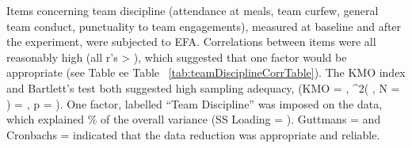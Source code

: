 Items concerning team discipline (attendance at meals, team curfew, general team conduct, punctuality to team engagements), measured at baseline and after the experiment, were subjected to EFA.  Correlations between items were all reasonably high (all r's > ), which suggested that one factor would be appropriate (see Table ee Table ~\ref{tab:teamDisciplineCorrTable}).
The KMO index and Bartlett's test both suggested high sampling adequacy,
(KMO
  = 
  , \chi^2(
  , N = )
  = ,
  p = ).
One factor, labelled ``Team Discipline'' was imposed on the data, which explained  \% of the overall variance
(SS Loading
  = ).
Guttmans
  \lambda = 
  and  Cronbachs
  \alpha = 
indicated that the data reduction was appropriate and reliable.














